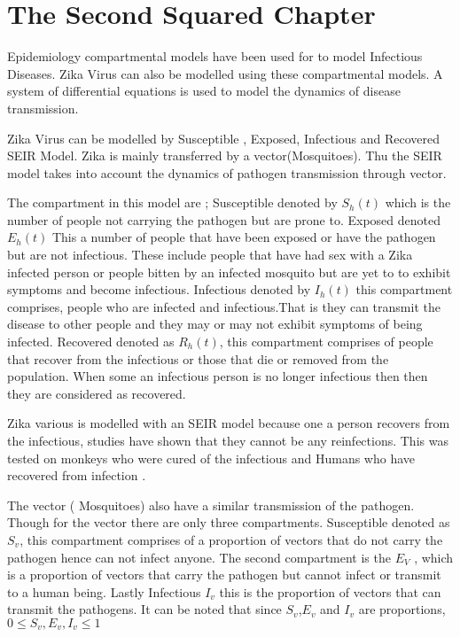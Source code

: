\chapter{The Second Squared Chapter}
Epidemiology compartmental models have been used for to model Infectious Diseases. Zika Virus can also be modelled using these compartmental models. A system of differential equations is used to model the dynamics of disease transmission.

Zika Virus can be modelled by Susceptible , Exposed, Infectious and Recovered SEIR Model. Zika is mainly transferred by a vector(Mosquitoes). Thu the SEIR model takes into account the dynamics of pathogen transmission through vector.

The compartment in this model are ; Susceptible denoted by $S_h(t)$ which is the number of people not carrying the pathogen but are prone to. Exposed denoted $E_h(t)$ This a number of people that have been exposed or have the pathogen but are not infectious. These include people that have had sex with a Zika infected person or people bitten by an infected mosquito but are yet to to exhibit symptoms and become infectious. Infectious denoted by $I_h(t)$ this compartment  comprises, people who are infected and infectious.That is they can transmit the disease to other people and they may or may not exhibit symptoms of being infected. Recovered denoted as $R_h(t)$, this compartment comprises of people that recover from the infectious or those that die or removed from the population. When some an infectious person is no longer infectious then then they are considered as recovered.

Zika various is modelled with an SEIR model because one a person recovers from the infectious, studies have shown that they cannot be any reinfections. This was tested on monkeys who were cured of the infectious and Humans who have recovered from infection \citep{posen2016epidemiology}.

The vector ( Mosquitoes) also have a similar transmission of the pathogen. Though for the vector there are only three compartments. Susceptible denoted as $S_v$, this compartment comprises of a proportion of vectors that do not carry the pathogen hence can not infect anyone. The second compartment is the $E_V$ , which is a proportion of vectors that carry the pathogen but cannot infect or transmit to a human being. Lastly Infectious $I_v$ this is the proportion of vectors that can transmit the pathogens. It can be noted that since $S_v$,$E_v$ and $I_v$ are proportions, $ 0 \le S_v,E_v , I_v \le 1$ 


